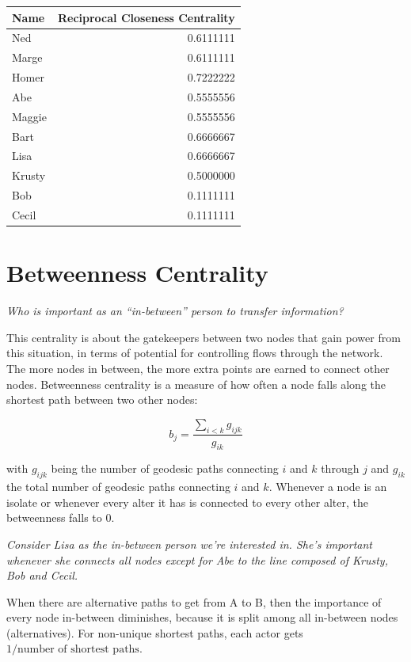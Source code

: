\documentclass[
  notitlepage,
  onecolumn,
  openany]{book}
\begin{document}
\begin{tabular}{l|r}
\hline
Name & Reciprocal Closeness Centrality\\
\hline
Ned & 0.6111111\\
\hline
Marge & 0.6111111\\
\hline
Homer & 0.7222222\\
\hline
Abe & 0.5555556\\
\hline
Maggie & 0.5555556\\
\hline
Bart & 0.6666667\\
\hline
Lisa & 0.6666667\\
\hline
Krusty & 0.5000000\\
\hline
Bob & 0.1111111\\
\hline
Cecil & 0.1111111\\
\hline
\end{tabular}

\hypertarget{betweenness-centrality}{%
\section{Betweenness Centrality}\label{betweenness-centrality}}

\emph{Who is important as an ``in-between'' person to transfer information?}

This centrality is about the gatekeepers between two nodes that gain power from this situation, in terms of potential for controlling flows through the network. The more nodes in between, the more extra points are earned to connect other nodes. Betweenness centrality is a measure of how often a node falls along the shortest path between two other nodes:

\[
b_j = \frac{\sum_{i<k}g_{ijk}}{g_{ik}}
\]

with \(g_{ijk}\) being the number of geodesic paths connecting \(i\) and \(k\) through \(j\) and \(g_{ik}\) the total number of geodesic paths connecting \(i\) and \(k\). Whenever a node is an isolate or whenever every alter it has is connected to every other alter, the betweenness falls to \(0\).

\emph{Consider Lisa as the in-between person we're interested in. She's important whenever she connects all nodes except for Abe to the line composed of Krusty, Bob and Cecil.}

When there are alternative paths to get from A to B, then the importance of every node in-between diminishes, because it is split among all in-between nodes (alternatives). For non-unique shortest paths, each actor gets \(1/\text{number of shortest paths}\).
\end{document}
